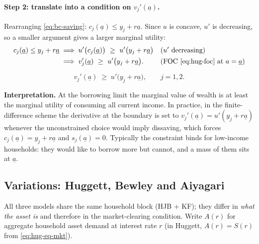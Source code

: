 \paragraph{Step 2: translate into a condition on $v_j'(\underline a)$.}
Rearranging \eqref{eq:bc-saving}: $c_j(\underline a)\le y_j+r\underline a$. Since $u$ is concave, $u'$ is decreasing, so a smaller argument gives a larger marginal utility:
\begin{align*}
  c_j(\underline a)\le y_j+r\underline a
  &\;\Longrightarrow\; u'\big(c_j(\underline a)\big)\ \ge\ u'\big(y_j+r\underline a\big) &&\text{(}u'\text{ decreasing)}\\
  &\;\Longrightarrow\; v_j'(\underline a)\ \ge\ u'\big(y_j+r\underline a\big). &&\text{(FOC \eqref{eq:hug-foc} at }a=\underline a\text{)}
\end{align*}
\begin{keybox}[title=State-constraint boundary condition]
\begin{equation}\label{eq:state-constraint}
  v_j'(\underline a)\;\ge\;u'\big(y_j+r\underline a\big),\qquad j=1,2.
\end{equation}
\end{keybox}
\textbf{Interpretation.} At the borrowing limit the marginal value of wealth is at least the marginal utility of consuming all current income. In practice, in the finite-difference scheme the derivative at the boundary is set to $v_j'(\underline a)=u'(y_j+r\underline a)$ whenever the unconstrained choice would imply dissaving, which forces $c_j(\underline a)= y_j+r\underline a$ and $s_j(\underline a)=0$. Typically the constraint binds for low-income households: they would like to borrow more but cannot, and a mass of them sits at $\underline a$.

\subsection{Variations: Huggett, Bewley and Aiyagari }

All three models share the same household block (HJB + KF); they differ in \emph{what the asset is} and therefore in the market-clearing condition. Write $A(r)$ for aggregate household asset demand at interest rate $r$ (in Huggett, $A(r)=S(r)$ from \eqref{eq:hug-eq-mkt}).

